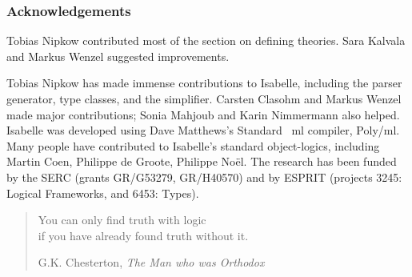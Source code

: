 \subsubsection*{Acknowledgements} 
Tobias Nipkow contributed most of the section on defining theories.
Sara Kalvala and Markus Wenzel suggested improvements.

Tobias Nipkow has made immense contributions to Isabelle, including the
parser generator, type classes, and the simplifier.  Carsten Clasohm and
Markus Wenzel made major contributions; Sonia Mahjoub and Karin Nimmermann
also helped.  Isabelle was developed using Dave Matthews's Standard~{\sc
  ml} compiler, Poly/{\sc ml}.  Many people have contributed to Isabelle's
standard object-logics, including Martin Coen, Philippe de Groote, Philippe
No\"el.  The research has been funded by the SERC (grants GR/G53279,
GR/H40570) and by ESPRIT (projects 3245: Logical Frameworks, and 6453:
Types).

\newpage
\pagestyle{plain} \tableofcontents 
\newpage

\vspace*{2.5cm}
\begin{quote}
\raggedleft
{\sanssi
You can only find truth with logic\\
if you have already found truth without it.}\\
\bigskip

G.K. Chesterton, {\em The Man who was Orthodox}
\end{quote}

\clearfirst  \pagestyle{headings}




 \small\raggedright\frenchspacing





